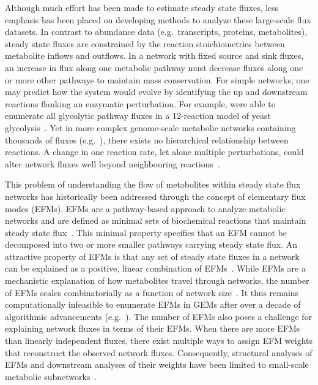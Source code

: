 \documentclass[12pt]{article}
\begin{document}
Although much effort has been made to estimate steady state fluxes, less
emphasis has been placed on developing methods to analyze these
large-scale flux datasets. In contrast to abundance data (e.g.\
transcripts, proteins, metabolites), steady state fluxes are constrained
by the reaction stoichiometries between metabolite inflows and outflows.
In a network with fixed source and sink fluxes, an increase in flux along
one metabolic pathway must decrease fluxes along one or more other
pathways to maintain mass conservation. For simple networks, one may
predict how the system would evolve by identifying the up and downstream
reactions flanking an enzymatic perturbation. For example,
\citeauthor{SchwartzJean-Marc2006Qema} were able to
enumerate all glycolytic pathway fluxes in a 12-reaction model of yeast
glycolysis~\citep{SchwartzJean-Marc2006Qema}. Yet in more complex genome-scale
metabolic networks containing thousands of fluxes
(e.g.\ \cite{BrunkElizabeth2018Reat,RobinsonJonathanL2020Aaoh,WangHao2021Gmnr}),
there exists no hierarchical relationship between reactions. A change in one
reaction rate, let alone multiple perturbations, could alter network fluxes well
beyond neighbouring reactions~\citep{NobileMarcoS2021Agsa}.

This problem of understanding the flow of metabolites within steady state
flux networks has historically been addressed through the concept of
elementary flux modes (EFMs). EFMs are a pathway-based approach to analyze
metabolic networks and are defined as minimal sets of biochemical
reactions that maintain steady state flux~\citep{SchusterStefan1994Oefm}.
This minimal property specifies that an EFM cannot be decomposed into two
or more smaller pathways carrying steady state flux. An attractive
property of EFMs is that any set of steady state fluxes in a network can
be explained as a positive, linear combination of
EFMs~\citep{SchusterStefan1999Doef}. While EFMs are a mechanistic
explanation of how metabolites travel through networks, the number of EFMs
scales combinatorially as a function of network
size~\citep{AcunaVicente2009Maci}. It thus remains computationally
infeasible to enumerate EFMs in GEMs after over a decade of algorithmic
advancements (e.g.\
\citealt{GagneurJulien2004Coem,TerzerMarco2008Lcoe,BuchnerBiancaA2021EaPp}).
The number of EFMs also poses a challenge for explaining network fluxes in
terms of their EFMs. When there are more EFMs than linearly independent
fluxes, there exist multiple ways to assign EFM weights that reconstruct
the observed network fluxes. Consequently, structural analyses of EFMs and
downstream analyses of their weights have been limited to small-scale
metabolic
subnetworks~\citep{FakihIbrahim2023Dgmm,MpabanziLiliane2022Frca,ToyaYoshihiro2022Mpef,MatsudaFumio2011Esoy,SchwartzJean-Marc2006Qema}.
\end{document}
